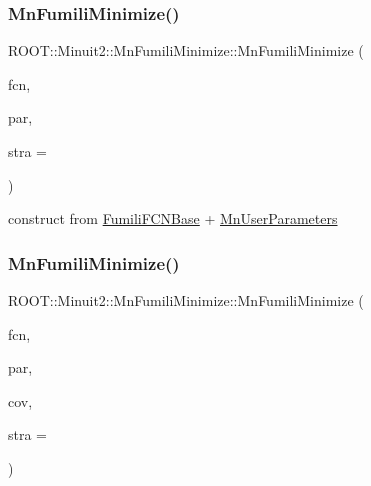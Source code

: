 \subsubsection{\texorpdfstring{MnFumiliMinimize()}{MnFumiliMinimize()}\hspace{0.1cm}{\footnotesize\ttfamily [11/21]}}
{\footnotesize\ttfamily R\+O\+O\+T\+::\+Minuit2\+::\+Mn\+Fumili\+Minimize\+::\+Mn\+Fumili\+Minimize (\begin{DoxyParamCaption}\item[{const \mbox{\hyperlink{classROOT_1_1Minuit2_1_1FumiliFCNBase}{Fumili\+F\+C\+N\+Base}} \&}]{fcn,  }\item[{const \mbox{\hyperlink{classROOT_1_1Minuit2_1_1MnUserParameters}{Mn\+User\+Parameters}} \&}]{par,  }\item[{unsigned int}]{stra = {} }\end{DoxyParamCaption})\hspace{0.3cm}{\ttfamily [inline]}}



construct from \mbox{\hyperlink{classROOT_1_1Minuit2_1_1FumiliFCNBase}{Fumili\+F\+C\+N\+Base}} + \mbox{\hyperlink{classROOT_1_1Minuit2_1_1MnUserParameters}{Mn\+User\+Parameters}} 

\mbox{\label{classROOT_1_1Minuit2_1_1MnFumiliMinimize_a3dd4f225ca0cdfdc6eb542ee32667984}} 
\subsubsection{\texorpdfstring{MnFumiliMinimize()}{MnFumiliMinimize()}\hspace{0.1cm}{\footnotesize\ttfamily [12/21]}}
{\footnotesize\ttfamily R\+O\+O\+T\+::\+Minuit2\+::\+Mn\+Fumili\+Minimize\+::\+Mn\+Fumili\+Minimize (\begin{DoxyParamCaption}\item[{const \mbox{\hyperlink{classROOT_1_1Minuit2_1_1FumiliFCNBase}{Fumili\+F\+C\+N\+Base}} \&}]{fcn,  }\item[{const \mbox{\hyperlink{classROOT_1_1Minuit2_1_1MnUserParameters}{Mn\+User\+Parameters}} \&}]{par,  }\item[{const \mbox{\hyperlink{classROOT_1_1Minuit2_1_1MnUserCovariance}{Mn\+User\+Covariance}} \&}]{cov,  }\item[{unsigned int}]{stra = {} }\end{DoxyParamCaption})\hspace{0.3cm}{\ttfamily [inline]}}



